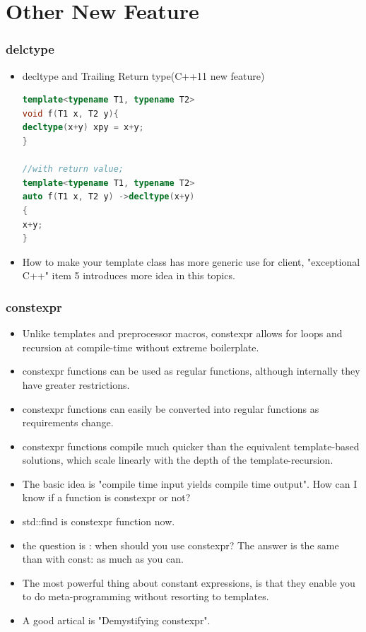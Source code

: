 \documentclass[a4paper,12pt,twoside]{book}
\begin{document}
\section{Other New Feature}
\subsubsection{delctype}
\begin{itemize}


\item decltype and  Trailing Return type(C++11 new feature)
\begin{lstlisting}[frame=single, language=c++]
template<typename T1, typename T2>
void f(T1 x, T2 y){
decltype(x+y) xpy = x+y;
}

//with return value;
template<typename T1, typename T2>
auto f(T1 x, T2 y) ->decltype(x+y)
{
x+y;
}
\end{lstlisting}

\item How to make your template class has more generic use for client, "exceptional C++" item 5 introduces more idea in this topics.

\end{itemize}

\subsubsection{constexpr}
\begin{itemize}

\item Unlike templates and preprocessor macros, constexpr allows for loops and recursion at compile-time without extreme boilerplate.

\item constexpr functions can be used as regular functions, although internally they have greater restrictions.

\item constexpr functions can easily be converted into regular functions as requirements change.

\item constexpr functions compile much quicker than the equivalent template-based solutions, which scale linearly with the depth of the template-recursion.

\item The basic idea is "compile time input yields compile time output". How can I know if a function is constexpr or not? 

\item std::find is constexpr function now. 

\item the question is : when should you use constexpr? The answer is the same than with const: as much as you can.

\item The most powerful thing about constant expressions, is that they enable you to do meta-programming without resorting to templates.

\item A good artical is "Demystifying constexpr". 
\end{itemize}
\end{document}
